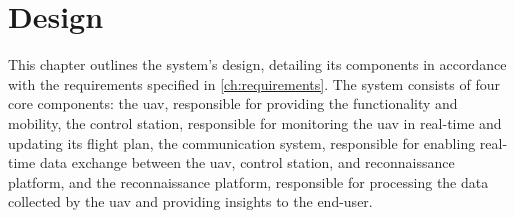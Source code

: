 \chapter{Design}\label{ch:design}

This chapter outlines the system's design, detailing its components in accordance with the requirements specified in \cref{ch:requirements}. The system consists of four core components: the \gls{uav}, responsible for providing the functionality and mobility, the control station, responsible for monitoring the \gls{uav} in real-time and updating its flight plan, the communication system, responsible for enabling real-time data exchange between the \gls{uav}, control station, and reconnaissance platform, and the reconnaissance platform, responsible for processing the data collected by the \gls{uav} and providing insights to the end-user.






